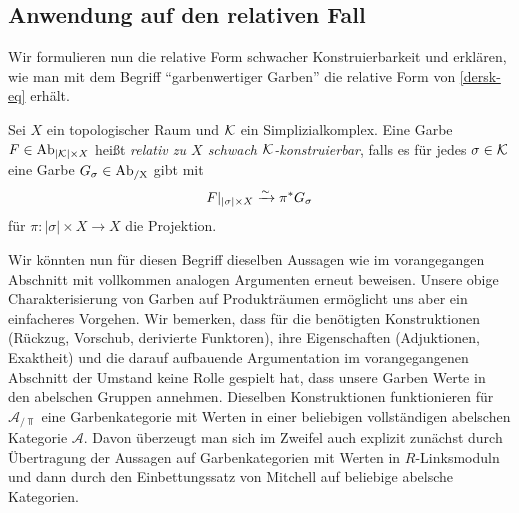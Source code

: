 \subsection{Anwendung auf den relativen Fall}

Wir formulieren nun die relative Form schwacher Konstruierbarkeit und
erklären, wie man mit dem Begriff ``garbenwertiger Garben'' die
relative Form von \ref{dersk-eq} erhält.
\begin{defn}
  Sei $X$ ein topologischer Raum und $\mathcal{K}$ ein Simplizialkomplex. Eine
  Garbe $F \in \operatorname{Ab}_{|\mathcal{K}| \times X}$ heißt \emph{relativ zu $X$ schwach
    $\mathcal{K}$-konstruierbar}, falls es für jedes $\sigma \in \mathcal{K}$ eine Garbe
  $G_\sigma \in \operatorname{Ab_{/X}}$ gibt mit
  \[ F|_{|\sigma| \times X} \xrightarrow[]{\sim} \pi^* G_\sigma \]
  für $\pi: |\sigma| \times X \to X$ die Projektion.
\end{defn}

Wir könnten nun für diesen Begriff dieselben Aussagen wie im
vorangegangen Abschnitt mit vollkommen analogen Argumenten erneut
beweisen. Unsere obige Charakterisierung von Garben auf Produkträumen
ermöglicht uns aber ein einfacheres Vorgehen. Wir bemerken, dass für
die benötigten Konstruktionen (Rückzug, Vorschub, derivierte
Funktoren), ihre Eigenschaften (Adjuktionen, Exaktheit) und die darauf
aufbauende Argumentation im vorangegangenen Abschnitt der Umstand
keine Rolle gespielt hat, dass unsere Garben Werte in den abelschen
Gruppen annehmen. Dieselben Konstruktionen funktionieren für
$\mathcal{A}_{/\Top}$ eine Garbenkategorie mit Werten in einer
beliebigen vollständigen abelschen Kategorie $\mathcal{A}$. Davon
überzeugt man sich im Zweifel auch explizit zunächst durch Übertragung
der Aussagen auf Garbenkategorien mit Werten in $R$-Linksmoduln und
dann durch den Einbettungssatz von Mitchell auf beliebige abelsche
Kategorien.

